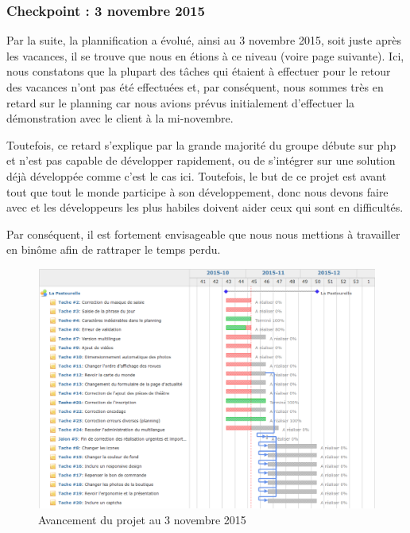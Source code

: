 \documentclass[11pt]{report}
\begin{document}
\subsubsection*{Checkpoint : 3 novembre 2015}
Par la suite, la plannification a évolué, ainsi au 3 novembre 2015, soit juste
après les vacances, il se trouve que nous en étions à ce niveau (voire page
suivante). Ici, nous constatons que la plupart des tâches qui étaient à
effectuer pour le retour des vacances n'ont pas été effectuées et, par
conséquent, nous sommes très en retard sur le planning car nous avions prévus
initialement d'effectuer la démonstration avec le client à la mi-novembre.
\par Toutefois, ce retard s'explique par la grande majorité du groupe débute sur
php et n'est pas capable de développer rapidement, ou de s'intégrer sur une
solution déjà développée comme c'est le cas ici. Toutefois, le but de ce projet
est avant tout que tout le monde participe à son développement, donc nous devons
faire avec et les développeurs les plus habiles doivent aider ceux qui sont en
difficultés. 
\par Par conséquent, il est fortement envisageable que nous nous mettions à
travailler en binôme afin de rattraper le temps perdu.

\begin{landscape}
\begin{figure}[t]
    \caption{Avancement du projet au 3 novembre 2015}
   \includegraphics[scale=0.5]{include/gantt3-11.png}
\end{figure}
\end{landscape}
\end{document}

